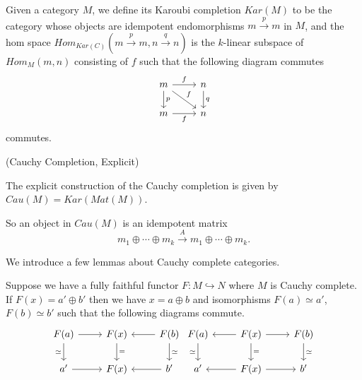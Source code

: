 \begin{definition}
  Given a category $M$, we define its Karoubi completion $Kar(M)$ to be the category whose objects are idempotent endomorphisms $m \xrightarrow{p} m$ in $M$, and the hom space $Hom_{Kar(C)}(m \xrightarrow{p} m, n \xrightarrow{q} n)$ is the $k$-linear subspace of $Hom_{M}(m,n)$ consisting of $f$ such that the following diagram commutes
  \[\begin{tikzcd}
	m & n \\
	m & n
	\arrow["f", from=1-1, to=1-2]
	\arrow["p", from=1-1, to=2-1]
	\arrow["f", from=1-1, to=2-2]
	\arrow["q", from=1-2, to=2-2]
	\arrow["f"', from=2-1, to=2-2]
\end{tikzcd}\] commutes.\end{definition}

\begin{definition} (Cauchy Completion, Explicit)

  The explicit construction of the Cauchy completion is given by $Cau(M)=Kar(Mat(M))$. \end{definition}

\noindent So an object in $Cau(M)$ is an idempotent matrix $$m_1\oplus\cdots\oplus m_k \xrightarrow{A} m_1\oplus\cdots\oplus m_k.$$

\noindent We introduce a few lemmas about Cauchy complete categories.

\begin{lemma}\label{direct_sum}
  Suppose we have a fully faithful functor $F:M\hookrightarrow N$ where $M$ is
  Cauchy complete. If $F(x)=a'\oplus b'$ then we have $x=a\oplus b$ and
  isomorphisms $F(a)\simeq a'$, $F(b)\simeq b'$ such that the following
  diagrams commute.
  \[
    \begin{tikzcd}
      {F(a)} & {F(x)} & {F(b)} \\
      {a'} & {F(x)} & {b'}
      \arrow[from=1-1, to=1-2]
      \arrow["\simeq"', from=1-1, to=2-1]
      \arrow["{=}", from=1-2, to=2-2]
      \arrow[from=1-3, to=1-2]
      \arrow["\simeq", from=1-3, to=2-3]
      \arrow[from=2-1, to=2-2]
      \arrow[from=2-3, to=2-2]
    \end{tikzcd} \begin{tikzcd}
      {F(a)} & {F(x)} & {F(b)} \\
      {a'} & {F(x)} & {b'}
      \arrow["\simeq"', from=1-1, to=2-1]
      \arrow[from=1-2, to=1-1]
      \arrow[from=1-2, to=1-3]
      \arrow["{=}", from=1-2, to=2-2]
      \arrow["\simeq", from=1-3, to=2-3]
      \arrow[from=2-2, to=2-1]
      \arrow[from=2-2, to=2-3]
    \end{tikzcd}
  \]
\end{lemma}


